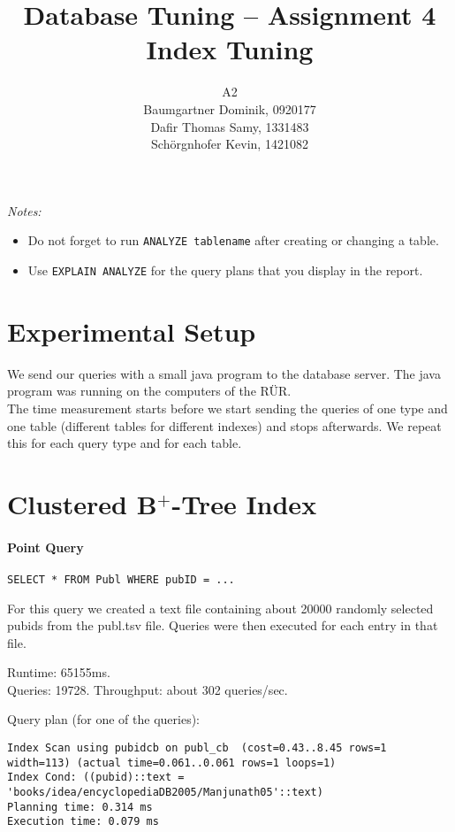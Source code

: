\documentclass[11pt]{scrartcl}
\title{
  \textbf{\large Database Tuning -- Assignment 4}\\
  Index Tuning
}
\author{
	A2\\
	\large Baumgartner Dominik, 0920177 \\
	\large Dafir Thomas Samy, 1331483 \\
	\large Sch\"orgnhofer Kevin, 1421082
}
\begin{document}
\maketitle

\noindent
{\it Notes:}
\begin{itemize}\itemsep=0pt
\item Do not forget to run {\tt ANALYZE tablename} after creating or
  changing a table.
\item Use {\tt EXPLAIN ANALYZE} for the query plans that you display in the report.
\end{itemize}


\section{Experimental Setup}

We send our queries with a small java program to the database server. The java program was running on the computers of the R\"UR.\\
The time measurement starts before we start sending the queries of one type and one table (different tables for different indexes) and stops afterwards. We repeat this for each query type and for each table.

\section{Clustered B$^+$-Tree Index}

\paragraph{Point Query}

{\small
\begin{verbatim}
SELECT * FROM Publ WHERE pubID = ...
\end{verbatim}
}



\noindent
For this query we created a text file containing about 20000 randomly selected pubids from the publ.tsv file. Queries were then executed for each entry in that file.

\smallskip\noindent
Runtime: 65155ms. \\
Queries: 19728.
Throughput: about 302 queries/sec.

\smallskip\noindent
Query plan (for one of the queries):
{\small
\begin{verbatim}
Index Scan using pubidcb on publ_cb  (cost=0.43..8.45 rows=1 width=113) (actual time=0.061..0.061 rows=1 loops=1)
Index Cond: ((pubid)::text = 'books/idea/encyclopediaDB2005/Manjunath05'::text)
Planning time: 0.314 ms
Execution time: 0.079 ms
\end{verbatim}
}
\end{document}
